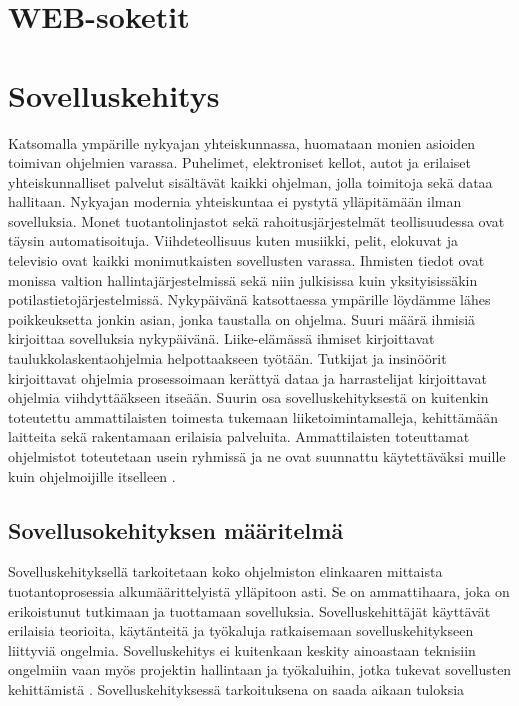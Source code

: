 \documentclass[utf8]{gradu3}
\begin{document}
\chapter{WEB-soketit}



\chapter{Sovelluskehitys}

Katsomalla ympärille nykyajan yhteiskunnassa, huomataan monien asioiden toimivan ohjelmien varassa. Puhelimet, elektroniset kellot, autot ja erilaiset yhteiskunnalliset palvelut sisältävät kaikki ohjelman, jolla toimitoja sekä dataa hallitaan. Nykyajan modernia yhteiskuntaa ei pystytä ylläpitämään ilman sovelluksia. Monet tuotantolinjastot sekä rahoitusjärjestelmät teollisuudessa ovat täysin automatisoituja. Viihdeteollisuus kuten musiikki, pelit, elokuvat ja televisio ovat kaikki monimutkaisten sovellusten varassa. Ihmisten tiedot ovat monissa valtion hallintajärjestelmissä sekä niin julkisissa kuin yksityisissäkin potilastietojärjestelmissä. Nykypäivänä katsottaessa ympärille löydämme lähes poikkeuksetta jonkin asian, jonka taustalla on ohjelma. Suuri määrä ihmisiä kirjoittaa sovelluksia nykypäivänä. Liike-elämässä ihmiset kirjoittavat taulukkolaskentaohjelmia helpottaakseen työtään. Tutkijat ja insinöörit kirjoittavat ohjelmia prosessoimaan kerättyä dataa ja harrastelijat kirjoittavat ohjelmia viihdyttääkseen itseään. Suurin osa sovelluskehityksestä on kuitenkin toteutettu ammattilaisten toimesta tukemaan liiketoimintamalleja, kehittämään laitteita sekä rakentamaan erilaisia palveluita. Ammattilaisten toteuttamat ohjelmistot toteutetaan usein ryhmissä ja ne ovat suunnattu käytettäväksi muille kuin ohjelmoijille itselleen \parencite[s.4]{Sommerville}.

\section{Sovellusokehityksen määritelmä}
Sovelluskehityksellä tarkoitetaan koko ohjelmiston elinkaaren mittaista tuotantoprosessia alkumäärittelyistä ylläpitoon asti. Se on ammattihaara, joka on erikoistunut tutkimaan ja tuottamaan sovelluksia. Sovelluskehittäjät käyttävät erilaisia teorioita, käytänteitä ja työkaluja ratkaisemaan sovelluskehitykseen liittyviä ongelmia. Sovelluskehitys ei kuitenkaan keskity ainoastaan teknisiin ongelmiin vaan myös projektin hallintaan ja työkaluihin, jotka tukevat sovellusten kehittämistä \parencite[s.1-10]{Sommerville}. Sovelluskehityksessä tarkoituksena on saada aikaan tuloksia 
\end{document}
